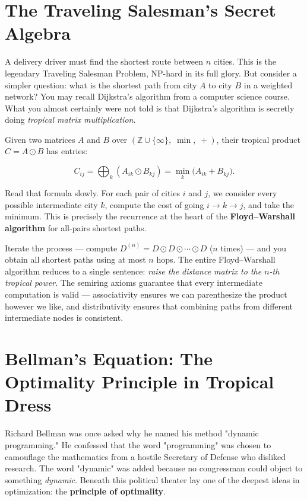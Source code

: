 \documentclass[11pt,twoside,openright]{book}
\theoremstyle{definition}
\theoremstyle{remark}
\begin{document}
\section{The Traveling Salesman's Secret Algebra}

A delivery driver must find the shortest route between $n$ cities. This is the legendary Traveling Salesman Problem, NP-hard in its full glory. But consider a simpler question: what is the shortest path from city $A$ to city $B$ in a weighted network? You may recall Dijkstra's algorithm from a computer science course. What you almost certainly were not told is that Dijkstra's algorithm is secretly doing \textit{tropical matrix multiplication}.

Given two matrices $A$ and $B$ over $(\mathbb{Z} \cup \{\infty\},\; \min,\; +)$, their tropical product $C = A \odot B$ has entries:

\[C_{ij} = \bigoplus_k (A_{ik} \odot B_{kj}) = \min_k \big(A_{ik} + B_{kj}\big).\]

Read that formula slowly. For each pair of cities $i$ and $j$, we consider every possible intermediate city $k$, compute the cost of going $i \to k \to j$, and take the minimum. This is precisely the recurrence at the heart of the \textbf{Floyd--Warshall algorithm} for all-pairs shortest paths.


Iterate the process --- compute $D^{(n)} = D \odot D \odot \cdots \odot D$ ($n$ times) --- and you obtain all shortest paths using at most $n$ hops. The entire Floyd--Warshall algorithm reduces to a single sentence: \textit{raise the distance matrix to the $n$-th tropical power}. The semiring axioms guarantee that every intermediate computation is valid --- associativity ensures we can parenthesize the product however we like, and distributivity ensures that combining paths from different intermediate nodes is consistent.


\section{Bellman's Equation: The Optimality Principle in Tropical Dress}

Richard Bellman was once asked why he named his method "dynamic programming." He confessed that the word "programming" was chosen to camouflage the mathematics from a hostile Secretary of Defense who disliked research. The word "dynamic" was added because no congressman could object to something \textit{dynamic}. Beneath this political theater lay one of the deepest ideas in optimization: the \textbf{principle of optimality}.
\end{document}

